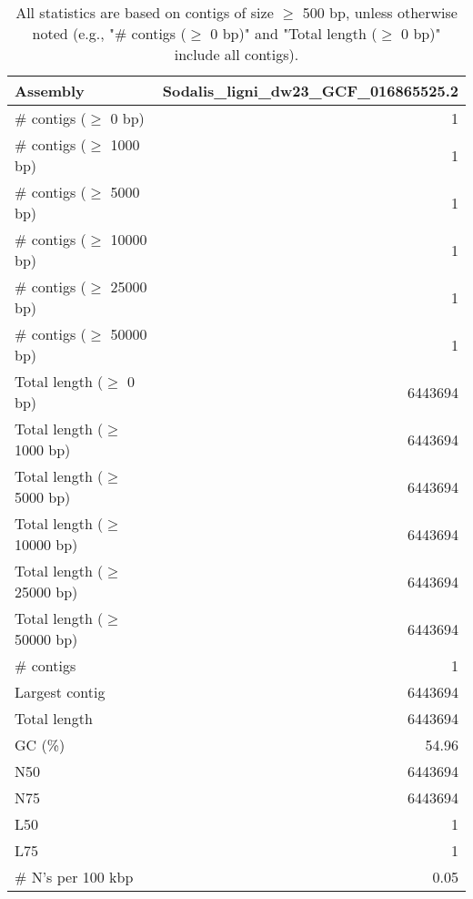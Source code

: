 \documentclass[12pt,a4paper]{article}
\begin{document}
\begin{table}[ht]
\begin{center}
\caption{All statistics are based on contigs of size $\geq$ 500 bp, unless otherwise noted (e.g., "\# contigs ($\geq$ 0 bp)" and "Total length ($\geq$ 0 bp)" include all contigs).}
\begin{tabular}{|l*{1}{|r}|}
\hline
Assembly & Sodalis\_ligni\_dw23\_GCF\_016865525.2 \\ \hline
\# contigs ($\geq$ 0 bp) & 1 \\ \hline
\# contigs ($\geq$ 1000 bp) & 1 \\ \hline
\# contigs ($\geq$ 5000 bp) & 1 \\ \hline
\# contigs ($\geq$ 10000 bp) & 1 \\ \hline
\# contigs ($\geq$ 25000 bp) & 1 \\ \hline
\# contigs ($\geq$ 50000 bp) & 1 \\ \hline
Total length ($\geq$ 0 bp) & 6443694 \\ \hline
Total length ($\geq$ 1000 bp) & 6443694 \\ \hline
Total length ($\geq$ 5000 bp) & 6443694 \\ \hline
Total length ($\geq$ 10000 bp) & 6443694 \\ \hline
Total length ($\geq$ 25000 bp) & 6443694 \\ \hline
Total length ($\geq$ 50000 bp) & 6443694 \\ \hline
\# contigs & 1 \\ \hline
Largest contig & 6443694 \\ \hline
Total length & 6443694 \\ \hline
GC (\%) & 54.96 \\ \hline
N50 & 6443694 \\ \hline
N75 & 6443694 \\ \hline
L50 & 1 \\ \hline
L75 & 1 \\ \hline
\# N's per 100 kbp & 0.05 \\ \hline
\end{tabular}
\end{center}
\end{table}
\end{document}
